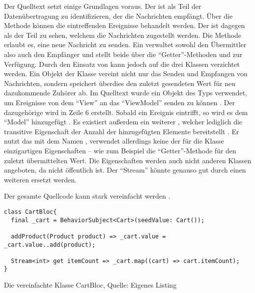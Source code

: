 Der Quelltext setzt einige Grundlagen voraus.
Der  ist als Teil der Datenübertragung zu identifizieren,
der die Nachrichten empfängt.
Über die Methode  können die eintreffenden Ereignisse behandelt werden.
Der  ist dagegen als der Teil zu sehen,
welchem die Nachrichten zugestellt werden.
Die Methode  erlaubt es,
eine neue Nachricht zu senden.
Ein  verwaltet sowohl den Übermittler also auch den Empfänger
und stellt beide über die \enquote{Getter}-Methoden  und  zur Verfügung.
Durch den Einsatz von  kann jedoch auf die drei Klassen verzichtet werden.
Ein Objekt der Klasse  vereint nicht nur das Senden und Empfangen von Nachrichten,
sondern speichert überdies den zuletzt gesendeten Wert für neu dazukommende Zuhörer ab.
Im Quelltext wurde ein Objekt des Typs  verwendet,
um Ereignisse von dem \enquote{View} an das \enquote{ViewModel} senden zu können .
Der dazugehörige  wird in Zeile 6 erstellt.
Sobald ein Ereignis eintrifft,
so wird es dem \enquote{Model}  hinzugefügt .
Es existiert außerdem ein weiterer  ,
 welcher lediglich die transitive Eigenschaft der Anzahl der hinzugefügten Elemente bereitstellt .
Er nutzt das  mit dem Namen  ,
verwendet allerdings keine der für die Klasse einzigartigen Eigenschaften
-- wie zum Beispiel die \enquote{Getter}-Methode  für den zuletzt übermittelten Wert.
Die Eigenschaften werden auch nicht anderen Klassen angeboten, da  nicht öffentlich ist.
Der \enquote{Stream}  könnte genauso gut durch einen weiteren  ersetzt werden.

Der gesamte Quellcode kann stark vereinfacht werden \Lst{\ref{lst:CartBlocVereinfacht}}.
\ifIncludeFigures
  \begin{listing}[h]
    \begin{verbatim}
class CartBloc{
  final _cart = BehaviorSubject<Cart>(seedValue: Cart());

  addProduct(Product product) => _cart.value = _cart.value..add(product);

  Stream<int> get itemCount => _cart.map((cart) => cart.itemCount);
}
\end{verbatim}
    \caption[Die vereinfachte Klasse CartBloc]{Die vereinfachte Klasse CartBloc, Quelle: Eigenes Listing}
    \label{lst:CartBlocVereinfacht}
  \end{listing}
\fi

